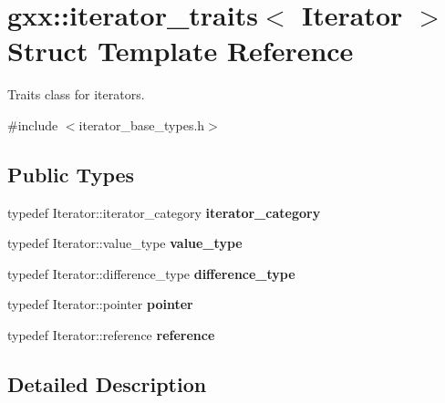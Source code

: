 \hypertarget{structgxx_1_1iterator__traits}{}\section{gxx\+:\+:iterator\+\_\+traits$<$ Iterator $>$ Struct Template Reference}
\label{structgxx_1_1iterator__traits}


Traits class for iterators.  




{\ttfamily \#include $<$iterator\+\_\+base\+\_\+types.\+h$>$}

\subsection*{Public Types}
\begin{DoxyCompactItemize}
\item 
typedef Iterator\+::iterator\+\_\+category {\bfseries iterator\+\_\+category}\hypertarget{structgxx_1_1iterator__traits_a88b9d14f2dd18ea0797a20b447a339a0}{}\label{structgxx_1_1iterator__traits_a88b9d14f2dd18ea0797a20b447a339a0}

\item 
typedef Iterator\+::value\+\_\+type {\bfseries value\+\_\+type}\hypertarget{structgxx_1_1iterator__traits_ad24a827ab8bd4f2656cbe6dd23451dec}{}\label{structgxx_1_1iterator__traits_ad24a827ab8bd4f2656cbe6dd23451dec}

\item 
typedef Iterator\+::difference\+\_\+type {\bfseries difference\+\_\+type}\hypertarget{structgxx_1_1iterator__traits_a41d2a4be18a25dfc30313e3959b04b7c}{}\label{structgxx_1_1iterator__traits_a41d2a4be18a25dfc30313e3959b04b7c}

\item 
typedef Iterator\+::pointer {\bfseries pointer}\hypertarget{structgxx_1_1iterator__traits_a3c68b5e277e1ddaaf3c6b4572cf4e416}{}\label{structgxx_1_1iterator__traits_a3c68b5e277e1ddaaf3c6b4572cf4e416}

\item 
typedef Iterator\+::reference {\bfseries reference}\hypertarget{structgxx_1_1iterator__traits_ad9601f13c38ba6a3be27fe790c394b69}{}\label{structgxx_1_1iterator__traits_ad9601f13c38ba6a3be27fe790c394b69}

\end{DoxyCompactItemize}


\subsection{Detailed Description}
